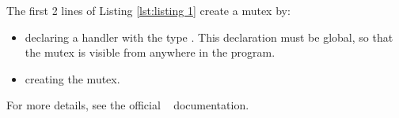 The first 2 lines of Listing \ref{lst:listing 1} create a mutex by:
\begin{itemize}
    \item declaring a handler with the type . This declaration must be global, so that the mutex is visible from anywhere in the program.
    \item creating the mutex.
\end{itemize}
For more details, see the official \rtos~ documentation.

